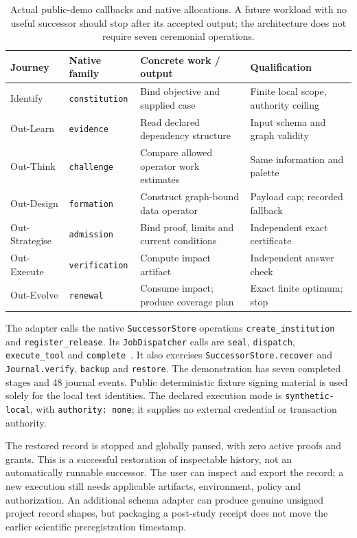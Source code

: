 \documentclass[11pt,letterpaper]{article}
\begin{document}
\begin{table}[htbp]
\centering\small
\begin{tabularx}{\textwidth}{@{}p{.97in}p{.95in}YY@{}}
\toprule
Journey & Native family & Concrete work / output & Qualification \\
\midrule
Identify & \texttt{constitution} & Bind objective and supplied case & Finite local scope, authority ceiling \\
Out-Learn & \texttt{evidence} & Read declared dependency structure & Input schema and graph validity \\
Out-Think & \texttt{challenge} & Compare allowed operator work estimates & Same information and palette \\
Out-Design & \texttt{formation} & Construct graph-bound data operator & Payload cap; recorded fallback \\
Out-Strategise & \texttt{admission} & Bind proof, limits and current conditions & Independent exact certificate \\
Out-Execute & \texttt{verification} & Compute impact artifact & Independent answer check \\
Out-Evolve & \texttt{renewal} & Consume impact; produce coverage plan & Exact finite optimum; stop \\
\bottomrule
\end{tabularx}
\caption{Actual public-demo callbacks and native allocations. A future workload with no useful successor should stop after its accepted output; the architecture does not require seven ceremonial operations.}
\label{tab:stages}
\end{table}

The adapter calls the native \texttt{SuccessorStore} operations \texttt{create\_institution} and \texttt{register\_release}. Its \texttt{JobDispatcher} calls are \texttt{seal}, \texttt{dispatch}, \texttt{execute\_tool} and \texttt{complete}~\cite{montrealai2026successorjobs,montrealai2026successorstate}. It also exercises \texttt{SuccessorStore.recover} and \texttt{Journal.verify}, \texttt{backup} and \texttt{restore}. The demonstration has seven completed stages and 48 journal events. Public deterministic fixture signing material is used solely for the local test identities. The declared execution mode is \texttt{synthetic-local}, with \texttt{authority: none}; it supplies no external credential or transaction authority.

The restored record is stopped and globally paused, with zero active proofs and grants. This is a successful restoration of inspectable history, not an automatically runnable successor. The user can inspect and export the record; a new execution still needs applicable artifacts, environment, policy and authorization. An additional schema adapter can produce genuine unsigned project record shapes, but packaging a post-study receipt does not move the earlier scientific preregistration timestamp.
\end{document}
